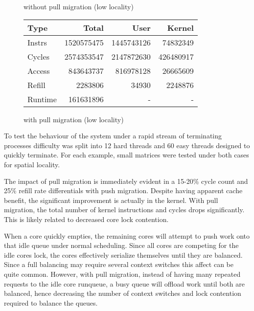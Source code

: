 \documentclass[11pt]{article}
\begin{document}
\begin{figure*}[!h]
\begin{subtable}{.48\textwidth}
\begin{tabular}{l|rrr}
			\hline
		\end{tabular}
		\caption{without pull migration (low locality)}
	\end{subtable}
	\hfill
	\begin{subtable}{.48\textwidth}
		\centering                 
		\begin{tabular}{l|rrr}  
			Type    & Total      & User       & Kernel    \\
			\hline
			Instrs  & 1520575475 & 1445743126 & 74832349  \\ 
			Cycles  & 2574353547 & 2147872630 & 426480917 \\ 
			Access  & 843643737  & 816978128  & 26665609  \\ 
			Refill  & 2283806    & 34930      & 2248876   \\ 
			Runtime & 161631896  & -          & -         \\ 
			\hline
		\end{tabular}
		\caption{with pull migration (low locality)}        
	\end{subtable}
\end{figure*}

To test the behaviour of the system under a rapid stream of terminating processes difficulty was split into 12 hard threads and 60 easy threads designed to quickly terminate.  For each example, small matrices were tested under both cases for spatial locality.

The impact of pull migration is immediately evident in a 15-20\% cycle count and 25\% refill rate differentials with push migration.  Despite having apparent cache benefit, the significant improvement is actually in the kernel.  With pull migration, the total number of kernel instructions and cycles drops significantly.  This is likely related to decreased core lock contention.

When a core quickly empties, the remaining cores will attempt to push work onto that idle queue under normal scheduling.  Since all cores are competing for the idle cores lock, the cores effectively serialize themselves until they are balanced.  Since a full balancing may require several context switches this affect can be quite common.  However, with pull migration, instead of having many repeated requests to the idle core runqueue, a busy queue will offload work until both are balanced, hence decreasing the number of context switches and lock contention required to balance the queues.
\end{document}
